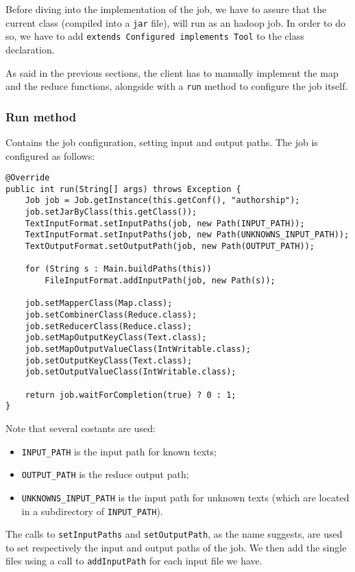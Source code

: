 \documentclass[a4paper,11pt, twoside]{article}
\begin{document}
	Before diving into the implementation of the job, we have to assure that the current class (compiled into a \verb|jar| file), will run as an hadoop job. In order to do so, we have to add \lstinline|extends Configured implements Tool| to the class declaration.
	
	\bigskip
	\noindent
	As said in the previous sections, the client has to manually implement the map and the reduce functions, alongside with a \lstinline|run| method to configure the job itself.

	\subsubsection{Run method}
	Contains the job configuration, setting input and output paths.
	The job is configured as follows:
	
	\begin{lstlisting}[firstnumber=45, caption={Run method}, captionpos=b]
@Override
public int run(String[] args) throws Exception {
	Job job = Job.getInstance(this.getConf(), "authorship");
	job.setJarByClass(this.getClass());
	TextInputFormat.setInputPaths(job, new Path(INPUT_PATH));
	TextInputFormat.setInputPaths(job, new Path(UNKNOWNS_INPUT_PATH));
	TextOutputFormat.setOutputPath(job, new Path(OUTPUT_PATH));
	
	for (String s : Main.buildPaths(this))
		FileInputFormat.addInputPath(job, new Path(s));
	
	job.setMapperClass(Map.class);
	job.setCombinerClass(Reduce.class);
	job.setReducerClass(Reduce.class);
	job.setMapOutputKeyClass(Text.class);
	job.setMapOutputValueClass(IntWritable.class);
	job.setOutputKeyClass(Text.class);
	job.setOutputValueClass(IntWritable.class);
	
	return job.waitForCompletion(true) ? 0 : 1;
}
	\end{lstlisting}
	
	Note that several costants are used: \begin{itemize}
		\item \lstinline|INPUT_PATH| is the input path for known texts;
		\item \lstinline|OUTPUT_PATH| is the reduce output path;
		\item \lstinline|UNKNOWNS_INPUT_PATH| is the input path for unknown texts (which are located in a subdirectory of \lstinline|INPUT_PATH|).
	\end{itemize}

	The calls to \lstinline|setInputPaths| and \lstinline|setOutputPath|, as the name suggests, are used to set respectively the input and output paths of the job. We then add the single files using a call to \lstinline|addInputPath| for each input file we have. 
	
\end{document}

